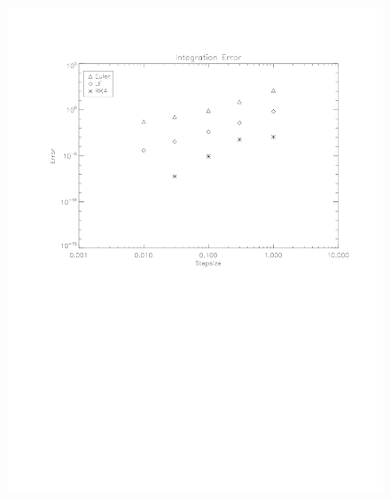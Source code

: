 \documentclass[11pt]{article}
\begin{document}
\begin{figure}
\centering
\includegraphics[scale = 0.7]{Error.pdf}
\caption{}
\end{figure}
\end{document}
